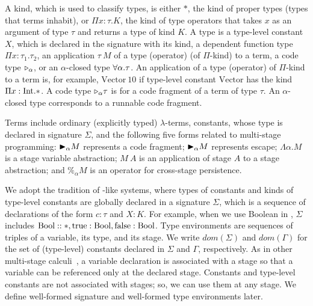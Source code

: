 


A kind, which is used to classify types, is either $*$, the kind of
proper types (types that terms inhabit), or $\Pi x\colon\tau.K$, the kind
of type operators that takes $x$ as an argument of type $\tau$ and returns a type
of kind $K$.
A type is a type-level constant $X$, which is declared in the signature with its kind, a dependent function type $\Pi x:\tau_1.\tau_2$,
an application $\tau\ M$ of a type (operator) (of $\Pi$-kind) to a term, a code type ${\mathop{\triangleright}}_\alpha$, or an $\alpha$-closed type $\forall\alpha.\tau$.
An application of a type (operator) of $\Pi$-kind to a term is, for example, $\text{Vector}\ 10$
if type-level constant $\text{Vector}$ has the kind $\Pi x:\textrm{Int}.*$.
A code type ${\mathop{\triangleright}}_\alpha \tau$ is for a code fragment of a term of type $\tau$.
An $\alpha$-closed type corresponds to a runnable code fragment.



Terms include ordinary (explicitly typed) \(\lambda\)-terms, constants,
whose type is declared in signature $\Sigma$, and the following five forms
related to multi-stage programming:
${\mathop{\blacktriangleright}}_\alpha M$ represents a code fragment; ${\mathop{\blacktriangleright}}_\alpha M$ represents escape;
$\Lambda\alpha.M$ is a stage variable abstraction;
$M\ A$ is an application of stage $A$ to a stage abstraction; and
$\%_\alpha M$ is an operator for cross-stage persistence.


We adopt the tradition of \LLF-like systems, where types of constants and kinds of type-level constants are globally declared in a signature $\Sigma$, which
is a sequence of declarations of the form $c:\tau$ and $X:K$.
For example, when we use Boolean in \LMD, $\Sigma$ includes $\textrm{Bool} :: *, \textrm{true}:\textrm{Bool}, \textrm{false}:\textrm{Bool}$.
Type environments are sequences of triples of a variable, its type, and its stage.
We write \(\textit{dom}(\Sigma)\) and \(\textit{dom}(\Gamma)\)
for the set of (type-level) constants declared in \(\Sigma\) and \(\Gamma\), respectively.   As in other multi-stage calculi~\cite{Taha03,Tsukada,Hanada2014},
a variable declaration is associated with a stage
so that a variable can be referenced only at the declared stage.
Constants and type-level constants are not associated with stages;
so, we can use them at any stage.
We define well-formed signature and well-formed type environments later.

